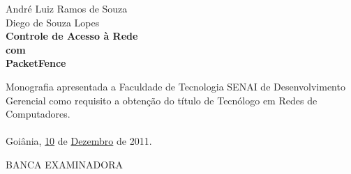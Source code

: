 \documentclass[brazil, ruledheader, pnumromarab,normaltoc]{abnt}
\begin{document}
\begin{folhadeaprovacao}
\setlength{\ABNTsignthickness}{0.4pt}
\setlength{\ABNTsignskip}{1cm}
\vspace*{0.2cm}
\begin{center}
\large André Luiz Ramos de Souza\\Diego de Souza Lopes\\
\vspace*{1.5cm}
\textbf{\LARGE Controle de Acesso à Rede\vspace{0.1cm}\\com\vspace{0.3cm}\\PacketFence}
\end{center}
\vspace*{1cm}
Monografia apresentada a Faculdade de Tecnologia SENAI de Desenvolvimento Gerencial como requisito a obtenção do título de Tecnólogo em Redes de Computadores.\\
\vspace*{0.2cm}\\
Goiânia, \uline{10}  de \uline{Dezembro} de 2011.\\
\begin{center}
BANCA EXAMINADORA
\end{center}
      
\end{folhadeaprovacao}
\sumario
\end{document}

